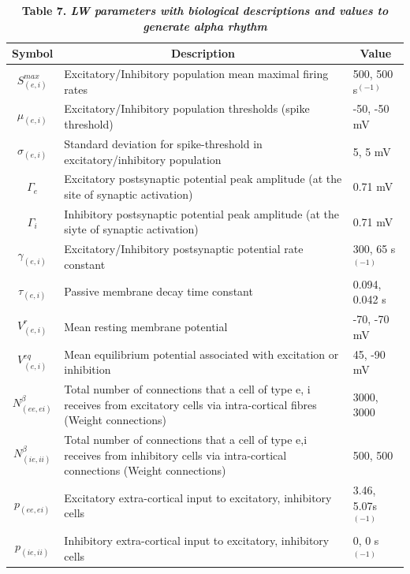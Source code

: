 \documentclass[12pt,twoside]{article}
\begin{document}
\begin{table}[H]
\begin{tabular}{|c|p{12cm}|p{2.5cm}| }
\hline
Symbol & \multicolumn{1}{|c|}{Description} & \multicolumn{1}{c|}{Value}  \\ 
 \hline
$S_{(e,i)}^{max}$ & Excitatory/Inhibitory population mean maximal firing rates & 500, 500 s$^{(-1)}$ \\ 
 \hline
$\mu_{(e,i)}$ & Excitatory/Inhibitory population thresholds (spike threshold) & -50, -50 mV \\ 
 \hline
$\sigma_{(e,i)}$ & Standard deviation for spike-threshold in excitatory/inhibitory population & 5, 5 mV\\
 \hline
$\Gamma_{e}$ & Excitatory postsynaptic potential peak amplitude (at the site of synaptic activation) & 0.71 mV\\%
 \hline
$\Gamma_{i}$ & Inhibitory postsynaptic potential peak amplitude (at the siyte of synaptic activation)	& 0.71 mV \\%
 \hline
$\gamma_{(e,i)}$ & Excitatory/Inhibitory postsynaptic potential rate constant & 300, 65 s$^{(-1)}$\\
\hline
$\tau_{(e,i)}$ & Passive membrane decay time constant & 0.094, 0.042 s \\
\hline
$V_{(e,i)}^{r}$ & Mean resting membrane potential & -70, -70 mV\\
\hline
$V_{(e,i)}^{eq}$ & Mean equilibrium potential associated with excitation or inhibition & 45, -90 mV\\
\hline
$N_{(ee,ei)}^{\beta}$ & Total number of connections that a cell of type e, i receives from excitatory cells via intra-cortical fibres (Weight connections) & 3000, 3000\\
\hline
$N_{(ie,ii)}^{\beta}$ & Total number of connections that a cell of type e,i receives from inhibitory cells via intra-cortical connections (Weight connections) & 500, 500\\
\hline
$p_{(ee,ei)}$ & Excitatory extra-cortical input to excitatory, inhibitory cells & 3.46, 5.07s$^{(-1)}$\\
\hline
$p_{(ie,ii)}$ & Inhibitory extra-cortical input to excitatory, inhibitory cells &	0, 0  s$^{(-1)}$\\
\hline
\end{tabular}
\caption*{\textbf{Table 7.  \textit{LW parameters with biological descriptions and values to generate alpha rhythm}}}
\label{tab:Liley}
\end{table}
\end{document}
